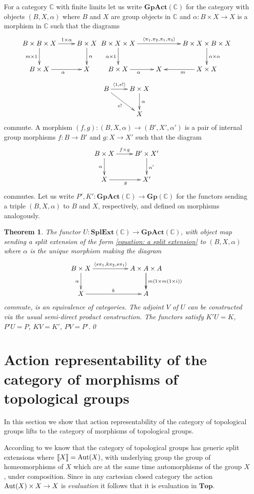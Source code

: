 \documentclass{article}
\newcommand{\C}{\mathbb{C}}
\newcommand{\SE}[1]{\mathbf{SplExt}(#1)}
\newcommand{\Aut}{\textnormal{Aut}}
\newcommand{\Top}{\mathbf{Top}}
\newcommand{\Gp}{\mathbf{Gp}}
\newcommand{\GpAct}{\mathbf{GpAct}}
\newcommand{\spexc}[1]{\llbracket#1\rrbracket}
\newtheorem{theorem}{Theorem}[section]
\begin{document}
For a category $\C$ with finite limits let us write $\GpAct(\C)$
for the category with objects $(B,X,\alpha)$ where $B$ and $X$ are group
objects in $\C$ and $\alpha\colon B\times X \to X$ is a morphism in $\C$
such that the diagrams
\[
\xymatrix{
B\times B\times X
\ar[r]^-{1\times \alpha}
\ar[d]_{m\times 1}
&
B\times X
\ar[d]^{\alpha}
\\
B\times X
\ar[r]_{\alpha}
&
X
}
\xymatrix{
B\times X\times X
\ar[rr]^-{\langle \pi_1, \pi_2,\pi_1,\pi_3\rangle}
\ar[d]_{\alpha\times 1}
&&
B\times X \times B\times X
\ar[d]^{\alpha\times \alpha}
\\
B\times X
\ar[r]_{\alpha}
&
X
&
X\times X
\ar[l]^{m}
}
\]
\[
\xymatrix{
B
\ar[r]^-{\langle 1,e!\rangle}
\ar[rd]_{e!}
&
B\times X
\ar[d]^{\alpha}
\\
&
X
}
\]
commute. A morphism $(f,g):(B,X,\alpha)\to (B',X',\alpha')$ is a pair of internal
group morphisms $f:B\to B'$ and $g:X\to X'$ such that the diagram
\[
\xymatrix{
B\times X
\ar[r]^-{f\times g}
\ar[d]_{\alpha}
&
B'\times X'
\ar[d]^{\alpha'}
\\
X
\ar[r]_{g}
&
X'
}
\]
commutes. Let us write $P',K':\GpAct(\C)\to \Gp(\C)$ for the functors sending a triple $(B,X,\alpha)$ to $B$ and $X$, respectively,
and defined on morphisms analogously.
\begin{theorem}\label{theorem: act}
The functor $U\colon \SE{\C}\to \GpAct(\C)$, with object map sending a split extension of the form \eqref{equation: a split extension} to $(B,X,\alpha)$ where $\alpha$ is the unique morphism
making the diagram
\[
\xymatrix@C=12ex{
B\times X
\ar[d]_{\alpha}
\ar[r]^{}^-{\langle s\pi_1,k\pi_2,s\pi_1\rangle}
&
A\times A \times A
\ar[d]
\ar[d]^{m(1\times m(1\times i))}
\\
X
\ar[r]^{k}
&
A
}
\]
commute, is an equivalence of categories. The adjoint $V$ of $U$ can be constructed via the usual semi-direct product construction.
The functors satisfy $K'U=K$, $P'U=P$, $KV=K'$, $PV=P'$.\qed
\end{theorem}

\section{Action representability of the category of morphisms of topological groups}
In this section we show that action representability of the category of topological groups
lifts to the category of morphisms of topological groups.

According to \cite{CAGLIARI_CLEMENTINO:2019} we know that the category of topological groups
has generic split extensions where $\spexc{X}=\Aut(X)$, with underlying group the group of
homeomorphisms of $X$ which are at the same time automorphisms of the group $X$, under composition.
Since in any cartesian closed category the action $\Aut(X)\times X \to X$ is \emph{evaluation}
it follows that it is evaluation in $\Top$.
\end{document}

